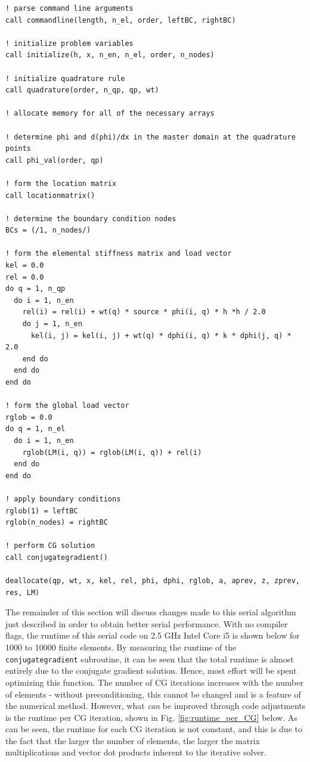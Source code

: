 \documentclass[10pt]{article}
\begin{document}
\begin{lstlisting}
! parse command line arguments
call commandline(length, n_el, order, leftBC, rightBC)

! initialize problem variables
call initialize(h, x, n_en, n_el, order, n_nodes)  

! initialize quadrature rule    
call quadrature(order, n_qp, qp, wt)      

! allocate memory for all of the necessary arrays             

! determine phi and d(phi)/dx in the master domain at the quadrature points
call phi_val(order, qp)

! form the location matrix
call locationmatrix()

! determine the boundary condition nodes
BCs = (/1, n_nodes/)

! form the elemental stiffness matrix and load vector
kel = 0.0
rel = 0.0
do q = 1, n_qp
  do i = 1, n_en
    rel(i) = rel(i) + wt(q) * source * phi(i, q) * h *h / 2.0
    do j = 1, n_en
      kel(i, j) = kel(i, j) + wt(q) * dphi(i, q) * k * dphi(j, q) * 2.0
    end do
  end do
end do

! form the global load vector
rglob = 0.0
do q = 1, n_el
  do i = 1, n_en
    rglob(LM(i, q)) = rglob(LM(i, q)) + rel(i)
  end do
end do

! apply boundary conditions
rglob(1) = leftBC
rglob(n_nodes) = rightBC

! perform CG solution
call conjugategradient()

deallocate(qp, wt, x, kel, rel, phi, dphi, rglob, a, aprev, z, zprev, res, LM)
\end{lstlisting}

The remainder of this section will discuss changes made to this serial algorithm just described in order to obtain better serial performance. With no compiler flags, the runtime of this serial code on 2.5 GHz Intel Core i5 is shown below for 1000 to 10000 finite elements. By measuring the runtime of the {\tt conjugategradient} subroutine, it can be seen that the total runtime is almost entirely due to the conjugate gradient solution. Hence, most effort will be spent optimizing this function. The number of CG iterations increases with the number of elements - without preconditioning, this cannot be changed and is a feature of the numerical method. However, what {\it can} be improved through code adjustments is the runtime per CG iteration, shown in Fig. \ref{fig:runtime_per_CG} below. As can be seen, the runtime for each CG iteration is not constant, and this is due to the fact that the larger the number of elements, the larger the matrix multiplications and vector dot products inherent to the iterative solver. 
\end{document}
